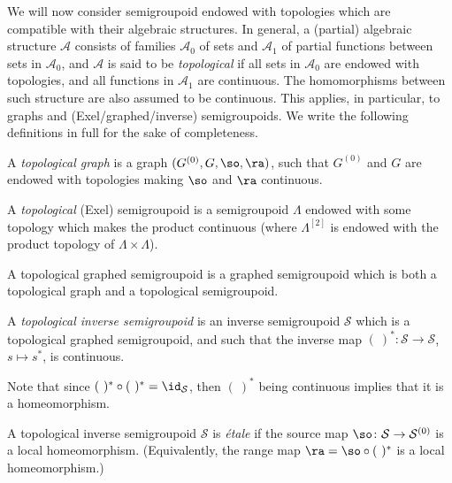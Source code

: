 We will now consider semigroupoid endowed with topologies which are compatible with their algebraic structures. In general, a (partial) algebraic structure $\mathscr{A}$ consists of families $\mathscr{A}_0$ of sets and $\mathscr{A}_1$ of partial functions between sets in $\mathscr{A}_0$, and $\mathscr{A}$ is said to be \emph{topological} if all sets in $\mathscr{A}_0$ are endowed with topologies, and all functions in $\mathscr{A}_1$ are continuous. The homomorphisms between such structure are also assumed to be continuous. This applies, in particular, to graphs and (Exel/graphed/inverse) semigroupoids. We write the following definitions in full for the sake of completeness.

\begin{definition}
A \emph{topological graph} is a graph $(G^{(0)},G,\so,\ra)$, such that $G^{(0)}$ and $G$ are endowed with topologies making $\so$ and $\ra$ continuous.

A \emph{topological} (Exel) semigroupoid is a semigroupoid $\Lambda$ endowed with some topology which makes the product continuous (where $\Lambda^{[2]}$ is endowed with the product topology of $\Lambda\times\Lambda$).

A topological graphed semigroupoid is a graphed semigroupoid which is both a topological graph and a topological semigroupoid.
\end{definition}

\begin{definition}
A \emph{topological inverse semigroupoid} is an inverse semigroupoid $\mathcal{S}$ which is a topological graphed semigroupoid, and such that the inverse map $(\ )^*\colon\mathcal{S}\to\mathcal{S}$, $s\mapsto s^*$, is continuous.
\end{definition}

Note that since $(\ )^*\circ (\ )^*=\id_{\mathcal{S}}$, then $(\ )^*$ being continuous implies that it is a homeomorphism.

\begin{definition}\label{def:etaleinversesemigroupoid}
A topological inverse semigroupoid $\mathcal{S}$ is \emph{étale} if the source map $\so\colon\mathcal{S}\to\mathcal{S}^{(0)}$ is a local homeomorphism. (Equivalently, the range map $\ra=\so\circ(\ )^*$ is a local homeomorphism.)
\end{definition}

